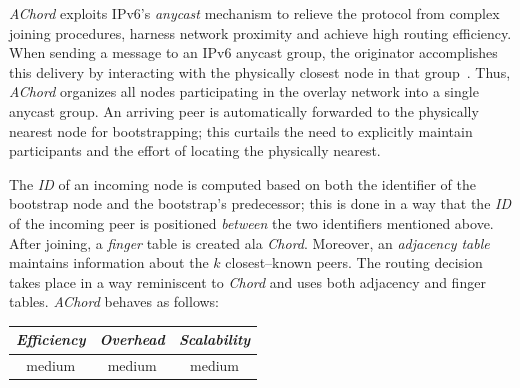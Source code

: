 \emph{AChord} \cite{DK2006} exploits IPv6's \emph{anycast} mechanism to
relieve the protocol from complex joining procedures,
harness network proximity and achieve high routing efficiency. 
When sending a message to an IPv6 anycast group, 
the originator accomplishes this delivery by interacting with
the physically closest node in that group~\cite{M2002}.
Thus, \emph{AChord} organizes all nodes participating
in the overlay network into a single anycast group. 
An arriving peer is automatically forwarded to the physically 
nearest node for
bootstrapping; this curtails the need to explicitly maintain participants
and the effort of locating the physically nearest. 

The \emph{ID} of an incoming node is computed based on 
both the identifier of the bootstrap node 
and the bootstrap's predecessor;
this is  done in a way that the \emph{ID} of the 
incoming peer is positioned \emph{between} the two identifiers mentioned above. 
After joining, a \emph{finger} table is created ala \emph{Chord}. 
Moreover, an \emph{adjacency table} maintains 
information about the $k$ closest--known peers. 
The routing decision takes place in a way reminiscent to \emph{Chord}
and uses both adjacency and finger tables.
\emph{AChord} behaves as follows:
\begin{center}
{\footnotesize
\begin{tabular}{ccc}
\emph{Efficiency} & \emph{Overhead} & \emph{Scalability} \\
\hline
medium &
medium &
medium
\end{tabular}
}
\end{center}

